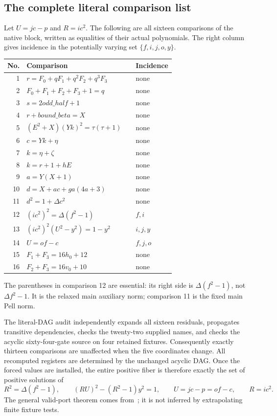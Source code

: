 \documentclass[11pt,letterpaper]{article}
\theoremstyle{definition}\newtheorem{definition}[theorem]{Definition}
\theoremstyle{remark}\newtheorem{remark}[theorem]{Remark}
\begin{document}
\subsection{The complete literal comparison list}
Let $U=jc-p$ and $R=ic^2$. The following are all sixteen comparisons of the native block, written as equalities of their actual polynomials. The right column gives incidence in the potentially varying set $\{f,i,j,o,y\}$.
\begin{center}\small
\begin{tabular}{@{}r p{0.68\linewidth} l@{}}\toprule
No.&Comparison&Incidence\\\midrule
1&$r=F_0+qF_1+q^2F_2+q^3F_3$&none\\
2&$F_0+F_1+F_2+F_3+1=q$&none\\
3&$s=2\mathit{odd\_half}+1$&none\\
4&$r+\mathit{bound\_beta}=X$&none\\
5&$(E^2+X)(Yk)^2=\tau(\tau+1)$&none\\
6&$c=Yk+\eta$&none\\
7&$k=\eta+\zeta$&none\\
8&$k=r+1+hE$&none\\
9&$a=Y(X+1)$&none\\
10&$d=X+ac+\mathit{ga}(4a+3)$&none\\
11&$d^2=1+\Delta c^2$&none\\
12&$(ic^2)^2=\Delta(f^2-1)$&$f,i$\\
13&$(ic^2)^2(U^2-y^2)=1-y^2$&$i,j,y$\\
14&$U=of-c$&$f,j,o$\\
15&$F_1+F_3=16h_0+12$&none\\
16&$F_2+F_3=16v_0+10$&none\\\bottomrule
\end{tabular}
\end{center}
The parentheses in comparison 12 are essential: its right side is $\Delta(f^2-1)$, not $\Delta f^2-1$. It is the relaxed main auxiliary norm; comparison 11 is the fixed main Pell norm.

The literal-DAG audit independently expands all sixteen residuals, propagates transitive dependencies, checks the twenty-two supplied names, and checks the acyclic sixty-four-gate source on four retained fixtures. Consequently exactly thirteen comparisons are unaffected when the five coordinates change. All recomputed registers are determined by the unchanged acyclic DAG. Once the forced values are installed, the entire positive fiber is therefore exactly the set of positive solutions of
\begin{equation}\label{fup:nf:eq:three}
 R^2=\Delta(f^2-1),\qquad
 (RU)^2-(R^2-1)y^2=1,\qquad U=jc-p=of-c,
 \qquad R=ic^2.
\end{equation}
The general valid-port theorem comes from~\cite{fup:nf:interface}; it is not inferred by extrapolating finite fixture tests.
\end{document}
